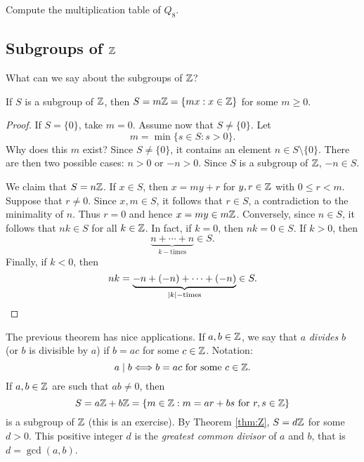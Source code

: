 \begin{exercise}
\label{xca:Q8_table}
    Compute the multiplication table of $Q_8$. 
\end{exercise}

\subsection{Subgroups of $\mathbb{Z}$}

What can we say about the subgroups of $\mathbb{Z}$? 

\begin{theorem}
        \label{thm:Z}
        If $S$ is a subgroup of $\mathbb{Z}$, then
                $S=m\mathbb{Z}=\{mx:x\in \mathbb{Z}\}$
                for some $m\geq0$.
        \end{theorem}
        
        \begin{proof}
                If $S=\{0\}$, take $m=0$. 
                Assume now that $S\ne\{0\}$. Let 
                \[
                m=\min\{s\in S:s>0\}.
                \]
                Why does this $m$ exist?  
                Since $S\ne\{0\}$,  
                it contains 
                an element $n\in S\setminus\{0\}$. 
                There are then two possible cases: 
                $n>0$ or $-n>0$. Since 
                $S$ is a subgroup of $\mathbb{Z}$, $-n\in S$.
        
                We claim that $S=n\mathbb{Z}$.
                If $x\in S$, then $x=my+r$ for $y,r\in\mathbb{Z}$ with 
                $0\leq r<m$. Suppose that $r\ne 0$. Since $x,m\in S$, it follows that 
                $r\in S$,
                a contradiction to the minimality of $n$. Thus $r=0$ 
                and hence $x=my\in
                m\mathbb{Z}$. Conversely, since $n\in S$, it follows that
                 $nk\in S$ for all $k\in\mathbb{Z}$. In fact, if $k=0$, then 
                 $nk=0\in S$. If $k>0$, 
                 then 
                \[
                \underbrace{n+\cdots+n}_{k-\text{times}}\in S.
                \]
                Finally, if $k<0$, 
                then 
                \[
                nk=\underbrace{-n+(-n)+\cdots+(-n)}_{|k|-\text{times}}\in S.\qedhere
                \]
        \end{proof}

The previous theorem has nice applications. 
If $a,b\in\mathbb{Z}$, we say that $a$ \emph{divides} $b$ (or $b$ is divisible by $a$)
if $b=ac$ for some $c\in\mathbb{Z}$. Notation: 
\[
a\mid b\Longleftrightarrow b=ac\text{ for some $c\in\mathbb{Z}$.}
\]
If $a,b\in\mathbb{Z}$ are such that $ab\ne0$, then 
\[
S=a\mathbb{Z}+b\mathbb{Z}=\{m\in\mathbb{Z}:m=ar+bs\text{ for $r,s\in\mathbb{Z}$}\}
\]
is a subgroup of $\mathbb{Z}$ (this is an exercise). 
By Theorem \ref{thm:Z}, $S=d\mathbb{Z}$ for some $d>0$. 
This positive integer $d$
is the \emph{greatest common divisor} of $a$ and $b$, 
that is $d=\gcd(a,b)$. 

